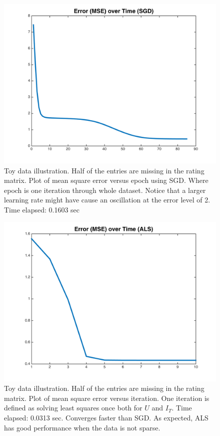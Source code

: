 \documentclass[11pt]{article}
\begin{document}
	\begin{figure}[H]
		\centering		
		\includegraphics[width=\wi]{buff2/5}
		\caption{Toy data illustration. Half of the entries are missing in the rating matrix. Plot of mean square error versus epoch using SGD. Where epoch is one iteration through whole dataset. Notice that a larger learning rate might have cause an oscillation at the error level of 2. Time elapsed: 0.1603 sec}
		\label{5}		
	\end{figure}
	\begin{figure}[H]
		\centering		
		\includegraphics[width=\wi]{buff2/6}
		\caption{Toy data illustration. Half of the entries are missing in the rating matrix. Plot of mean square error versus iteration. One iteration is defined as solving least squares once both for $U$ and $I_T$. Time elapsed: 0.0313 sec. Converges faster than SGD. As expected, ALS has good performance when the data is not sparse.}
		\label{5}		
	\end{figure}
	
\end{document}
